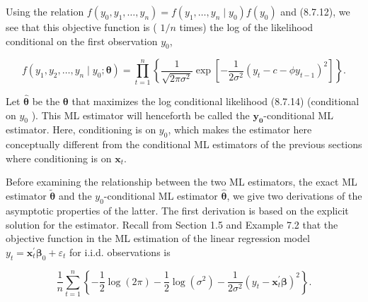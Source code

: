 \documentclass[10pt]{article}
\begin{document}
Using the relation $f\left(y_{0}, y_{1}, \ldots, y_{n}\right)=f\left(y_{1}, \ldots, y_{n} \mid y_{0}\right) f\left(y_{0}\right)$ and (8.7.12), we see that this objective function is ( $1 / n$ times) the log of the likelihood conditional on the first observation $y_{0}$,


\begin{equation*}
f\left(y_{1}, y_{2}, \ldots, y_{n} \mid y_{0} ; \boldsymbol{\theta}\right)=\prod_{t=1}^{n}\left\{\frac{1}{\sqrt{2 \pi \sigma^{2}}} \exp \left[-\frac{1}{2 \sigma^{2}}\left(y_{t}-c-\phi y_{t-1}\right)^{2}\right]\right\} . \tag{8.7.15}
\end{equation*}


Let $\hat{\boldsymbol{\theta}}$ be the $\boldsymbol{\theta}$ that maximizes the log conditional likelihood (8.7.14) (conditional on $y_{0}$ ). This ML estimator will henceforth be called the $\boldsymbol{y}_{\mathbf{0}}$-conditional ML estimator. Here, conditioning is on $y_{0}$, which makes the estimator here conceptually different from the conditional ML estimators of the previous sections where conditioning is on $\mathbf{x}_{t}$.

Before examining the relationship between the two ML estimators, the exact ML estimator $\tilde{\boldsymbol{\theta}}$ and the $y_{0}$-conditional ML estimator $\hat{\boldsymbol{\theta}}$, we give two derivations of the asymptotic properties of the latter. The first derivation is based on the explicit solution for the estimator. Recall from Section 1.5 and Example 7.2 that the objective function in the ML estimation of the linear regression model $y_{t}=\mathbf{x}_{t}^{\prime} \boldsymbol{\beta}_{0}+\varepsilon_{t}$ for i.i.d. observations is


\begin{equation*}
\frac{1}{n} \sum_{t=1}^{n}\left\{-\frac{1}{2} \log (2 \pi)-\frac{1}{2} \log \left(\sigma^{2}\right)-\frac{1}{2 \sigma^{2}}\left(y_{t}-\mathbf{x}_{t}^{\prime} \boldsymbol{\beta}\right)^{2}\right\} . \tag{8.7.16}
\end{equation*}
\end{document}
